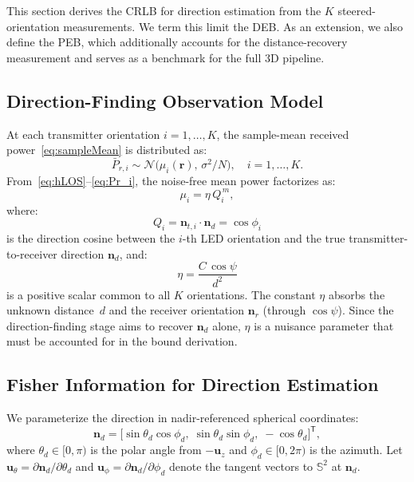\documentclass[journal]{IEEEtran}
\begin{document}
This section derives the CRLB for direction estimation from the $K$ steered-orientation measurements. We term this limit the DEB. As an extension, we also define the PEB, which additionally accounts for the distance-recovery measurement and serves as a benchmark for the full 3D pipeline.

\subsection{Direction-Finding Observation Model}
At each transmitter orientation $i=1,\ldots,K$, the sample-mean received power~\eqref{eq:sampleMean} is distributed as:
\begin{equation}
\bar P_{r,i} \sim 
  \mathcal{N}\!\bigl(\mu_{i}(\mathbf r),\,\sigma^{2}/N\bigr),
\quad i=1,\dots,K.
\end{equation}
From~\eqref{eq:hLOS}--\eqref{eq:Pr_i}, the noise-free mean power factorizes as:
\begin{equation}
\mu_i = \eta\,Q_i^{\,m},
\label{eq:mu_factorized}
\end{equation}
where:
\begin{equation}
Q_i = \mathbf{n}_{t,i}\cdot\mathbf{n}_d = \cos\phi_i
\label{eq:Q}
\end{equation}
is the direction cosine between the $i$-th LED orientation and the true transmitter-to-receiver direction $\mathbf{n}_d$, and:
\begin{equation}
\eta = \frac{C\,\cos\psi}{d^2}
\label{eq:eta_nuisance}
\end{equation}
is a positive scalar common to all $K$ orientations. The constant $\eta$ absorbs the unknown distance~$d$ and the receiver orientation $\mathbf{n}_r$ (through $\cos\psi$). Since the direction-finding stage aims to recover $\mathbf{n}_d$ alone, $\eta$ is a nuisance parameter that must be accounted for in the bound derivation.

\subsection{Fisher Information for Direction Estimation}
\label{subsec:FIM}
We parameterize the direction in nadir-referenced spherical coordinates:
\begin{equation}
\mathbf{n}_d = \bigl[\sin\theta_d\cos\phi_d,\;\sin\theta_d\sin\phi_d,\;-\cos\theta_d\bigr]^{\mathsf T},
\label{eq:nd_spherical}
\end{equation}
where $\theta_d\in[0,\pi)$ is the polar angle from $-\mathbf{u}_z$ and $\phi_d\in[0,2\pi)$ is the azimuth. Let $\mathbf{u}_\theta = \partial\mathbf{n}_d/\partial\theta_d$ and $\mathbf{u}_\phi = \partial\mathbf{n}_d/\partial\phi_d$ denote the tangent vectors to $\mathbb{S}^2$ at $\mathbf{n}_d$.
\end{document}
